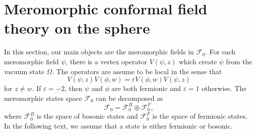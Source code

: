 \documentclass[10pt,reqno,draft]{article}
\numberwithin{equation}{section}
\numberwithin{figure}{section}
\numberwithin{table}{section}
\theoremstyle{plain}
\theoremstyle{definition}
\theoremstyle{remark}
\begin{document}
	\section{Meromorphic conformal field theory on the sphere}
	In this section, our main objects are the meromorphic fields in \(\mathcal{F}_{0}\). For each meromorphic field \(\psi\), there is a vertex operator \(V(\psi,z)\) which create \(\psi\) from the vacuum state \(\Omega\). The operators are assume to be local in the sense that 
	\begin{equation}
	  V(\psi,z)V(\phi,w)=\varepsilon V(\phi,w)V(\psi,z)
	\end{equation}
	for \(z\neq w\). If \(\varepsilon=-2\), then \(\psi\) and \(\phi\) are both fermionic and \(\varepsilon=1\) otherwise. The meromorphic states space \(\mathcal{F}_{0}\) can be decomposed as 
	\begin{equation}
	  \mathcal{F}_{0}=\mathcal{F}_{0}^{B}\oplus\mathcal{F}_{0}^{F},
	\end{equation}
	where \(\mathcal{F}_{0}^{B}\) is the space of bosonic states and \(\mathcal{F}_{0}^{F}\) is the space of fermionic states. In the following text, we assume that a state is either fermionic or bosonic. 
\end{document}
